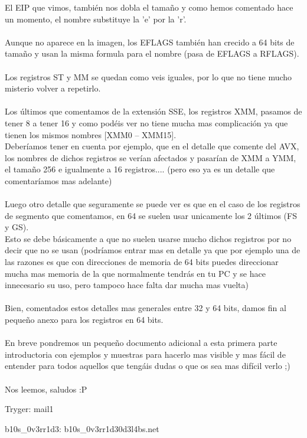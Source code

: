 \documentclass{fennix}
\begin{document}
El EIP que vimos, también nos dobla el tamaño y como hemos comentado hace un momento, el nombre substituye la 'e' por la 'r'.\\
\\
Aunque no aparece en la imagen, los EFLAGS también han crecido a 64 bits de tamaño y usan la misma formula para el nombre (pasa de EFLAGS a RFLAGS).\\
\\
Los registros ST y MM se quedan como veis iguales, por lo que no tiene mucho misterio volver a repetirlo.\\
\\
Los últimos que comentamos de la extensión SSE, los registros XMM, pasamos de tener 8 a tener 16 y como podéis ver no tiene mucha mas complicación ya que tienen los mismos nombres [XMM0 – XMM15].\\
Deberíamos tener en cuenta por ejemplo, que en el detalle que comente del AVX, los nombres de dichos registros se verían afectados y pasarían de XMM a YMM, el tamaño 256 e igualmente a 16 registros.... (pero eso ya es un detalle que comentaríamos mas adelante)\\
\\
Luego otro detalle que seguramente se puede ver es que en el caso de los registros de segmento que comentamos, en 64 se suelen usar unicamente los 2 últimos (FS y GS).\\
Esto se debe básicamente a que no suelen usarse mucho dichos registros por no decir que no se usan (podríamos entrar mas en detalle ya que por ejemplo una de las razones es que con direcciones de memoria de 64 bits puedes direccionar mucha mas memoria de la que normalmente tendrás en tu PC y se hace innecesario su uso, pero tampoco hace falta dar mucha mas vuelta)\\
\\
Bien, comentados estos detalles mas generales entre 32 y 64 bits, damos fin al pequeño anexo para los registros en 64 bits.\\
\\
En breve pondremos un pequeño documento adicional a esta primera parte introductoria con ejemplos y muestras para hacerlo mas visible y mas fácil de entender para todos aquellos que tengáis dudas o que os sea mas difícil verlo ;)\\
\\
Nos leemos, saludos :P

\begin{colabs}
	Tryger: mail1
	
	b10s\_0v3rr1d3: b10s\_0v3rr1d3\@c0d3\-l4bs.net
\end{colabs}
\end{document}
